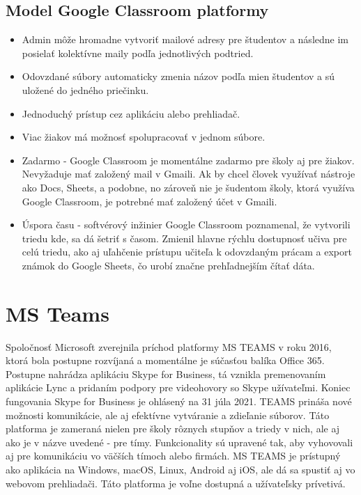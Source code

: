 \documentclass[10pt,slovak,a4paper]{article}
\begin{document}
\subsection{Model Google Classroom platformy} \label{Google Classroom: Google Classroom platforma}

\begin{itemize}
	\item Admin môže hromadne vytvoriť mailové adresy pre študentov a následne im posielať kolektívne maily podľa jednotlivých podtried. 
	\item Odovzdané súbory automaticky zmenia názov podľa mien študentov a sú uložené do jedného priečinku.
	\item Jednoduchý prístup cez aplikáciu alebo prehliadač.
	\item Viac žiakov má možnosť spolupracovať v jednom súbore.
	\item Zadarmo -
Google Classroom je momentálne zadarmo pre školy aj pre žiakov. Nevyžaduje mať založený mail v Gmaili. Ak by chcel človek využívať nástroje ako Docs, Sheets, a podobne, no zároveň nie je šudentom školy, ktorá využíva Google Classroom, je potrebné mať založený účet v Gmaili. 
	\item Úspora času - softvérový inžinier Google Classroom poznamenal, že vytvorili triedu kde, sa dá šetriť s časom. Zmienil hlavne rýchlu dostupnosť učiva pre celú triedu, ako aj uľahčenie prístupu učiteľa k odovzdaným prácam a export známok do Google Sheets, čo urobí značne prehľadnejším čítať dáta. \cite {GoogleClassroomPBL}
	\end{itemize}


\section{MS Teams} \label{MS Teams}
Spoločnosť Microsoft zverejnila príchod platformy MS TEAMS v roku 2016, ktorá bola postupne rozvíjaná a momentálne je súčasťou balíka Office 365. Postupne nahrádza aplikáciu Skype for Business, tá vznikla premenovaním aplikácie Lync a pridaním podpory pre videohovory so Skype užívateľmi. Koniec fungovania Skype for Business je ohlásený na 31 júla 2021. \cite{ohlasene_ukoncenie} TEAMS prináša nové možnosti komunikácie, ale aj efektívne vytváranie a zdieľanie súborov. Táto platforma je zameraná nielen pre školy rôznych stupňov a triedy v nich, ale aj ako je v názve uvedené - pre tímy. Funkcionality sú upravené tak, aby vyhovovali aj pre komunikáciu vo väčších tímoch alebo firmách. MS TEAMS je prístupný ako aplikácia na Windows, macOS, Linux, Android aj iOS, ale dá sa spustiť aj vo webovom prehliadači. Táto platforma je voľne dostupná a užívateľsky prívetivá. \cite {MS-TEAMS}
\end{document}
